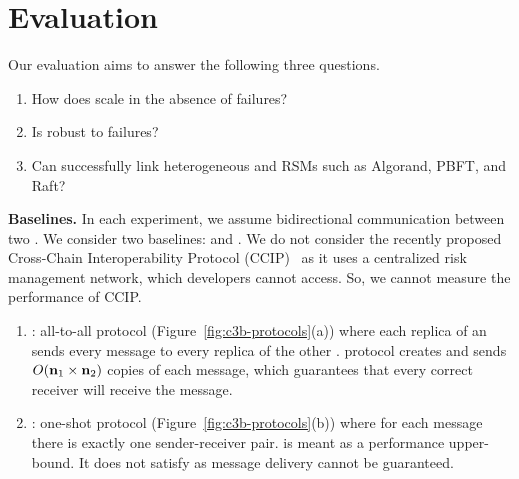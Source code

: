 \section{Evaluation}
\label{s:eval}
Our evaluation aims to answer the following three questions.
\begin{enumerate}
    \item How does \Scrooge{} scale in the absence of failures? 
    \item Is \Scrooge{} robust to failures? 
    \item Can \Scrooge{} successfully link heterogeneous \CFT{} and \BFT{} RSMs such as Algorand, PBFT, and Raft? 
\end{enumerate}

\textbf{Baselines.} In each experiment, we 
assume bidirectional communication between two . We consider two baselines: \ATA{} and \OTO{}. 
We do not consider the recently proposed Cross-Chain Interoperability Protocol (CCIP)~\cite{ccip}
as it uses a centralized risk management network, which developers cannot access. So, we cannot measure the performance of CCIP.
\begin{enumerate}
    \item {\bf \ATA{}}: all-to-all protocol (Figure~\ref{fig:c3b-protocols}(a)) 
    where each replica of an \RSM{} sends every message to every replica of the other \RSM{}.
    \ATA{} protocol creates and sends $O(\textbf{n}_{1}\times \textbf{n}_{2})$ copies of each message, 
    which guarantees that every correct receiver will receive the message.
    \item {\bf \OTO{}}: one-shot protocol (Figure~\ref{fig:c3b-protocols}(b)) 
    where for each message there is exactly one sender-receiver pair. 
    \OTO{} is meant as a performance upper-bound. It does not satisfy \CCC{} as message delivery cannot be guaranteed.
\end{enumerate}

%    
%    

